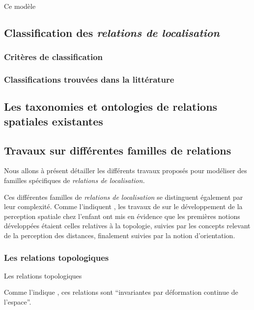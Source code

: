 Ce modèle 





\subsection{Classification des \emph{relations de localisation}}

\subsubsection{Critères de classification}

\subsubsection{Classifications trouvées dans la littérature}

\subsection{Les taxonomies et ontologies de relations spatiales
  existantes}

\subsection{Travaux sur différentes familles de relations}


Nous allons à présent détailler les différents travaux proposés pour
modéliser des familles spécifiques de \emph{relations de
  localisation.}

Ces différentes familles de \emph{relations de localisation} se
distinguent également par leur complexité. Comme l'indiquent
\textcite{Aurnague1997}, les travaux de \textcite{Piaget1948} sur le
développement de la perception spatiale chez l'enfant ont mis en
évidence que les premières notions développées étaient celles
relatives à la topologie, suivies par les concepts relevant de la
perception des distances, finalement suivies par la notion
d'orientation.

\subsubsection{Les relations topologiques}

Les relations topologiques 

Comme l'indique \textcite{Duchene2019}, ces relations sont
\enquote{invariantes par déformation continue de l’espace}.


